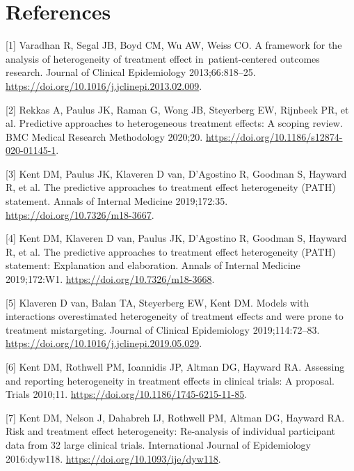 \documentclass[]{elsarticle} %
\newenvironment{cslreferences}%
  {}%
  {\par}
\begin{document}
\newpage

\hypertarget{references}{%
\section{References}\label{references}}

\setlength{\parindent}{-0.25in}
\setlength{\leftskip}{0.25in}

\noindent

\hypertarget{refs}{}
\begin{cslreferences}
\leavevmode\hypertarget{ref-Varadhan2013}{}%
{[}1{]} Varadhan R, Segal JB, Boyd CM, Wu AW, Weiss CO. A framework for
the analysis of heterogeneity of treatment effect in~patient-centered
outcomes research. Journal of Clinical Epidemiology 2013;66:818--25.
\url{https://doi.org/10.1016/j.jclinepi.2013.02.009}.

\leavevmode\hypertarget{ref-Rekkas2020}{}%
{[}2{]} Rekkas A, Paulus JK, Raman G, Wong JB, Steyerberg EW, Rijnbeek
PR, et al. Predictive approaches to heterogeneous treatment effects: A
scoping review. BMC Medical Research Methodology 2020;20.
\url{https://doi.org/10.1186/s12874-020-01145-1}.

\leavevmode\hypertarget{ref-Kent2019}{}%
{[}3{]} Kent DM, Paulus JK, Klaveren D van, D'Agostino R, Goodman S,
Hayward R, et al. The predictive approaches to treatment effect
heterogeneity (PATH) statement. Annals of Internal Medicine 2019;172:35.
\url{https://doi.org/10.7326/m18-3667}.

\leavevmode\hypertarget{ref-PathEnE}{}%
{[}4{]} Kent DM, Klaveren D van, Paulus JK, D'Agostino R, Goodman S,
Hayward R, et al. The predictive approaches to treatment effect
heterogeneity (PATH) statement: Explanation and elaboration. Annals of
Internal Medicine 2019;172:W1. \url{https://doi.org/10.7326/m18-3668}.

\leavevmode\hypertarget{ref-vanKlaveren2019}{}%
{[}5{]} Klaveren D van, Balan TA, Steyerberg EW, Kent DM. Models with
interactions overestimated heterogeneity of treatment effects and were
prone to treatment mistargeting. Journal of Clinical Epidemiology
2019;114:72--83. \url{https://doi.org/10.1016/j.jclinepi.2019.05.029}.

\leavevmode\hypertarget{ref-Kent2010}{}%
{[}6{]} Kent DM, Rothwell PM, Ioannidis JP, Altman DG, Hayward RA.
Assessing and reporting heterogeneity in treatment effects in clinical
trials: A proposal. Trials 2010;11.
\url{https://doi.org/10.1186/1745-6215-11-85}.

\leavevmode\hypertarget{ref-Kent2016}{}%
{[}7{]} Kent DM, Nelson J, Dahabreh IJ, Rothwell PM, Altman DG, Hayward
RA. Risk and treatment effect heterogeneity: Re-analysis of individual
participant data from 32 large clinical trials. International Journal of
Epidemiology 2016:dyw118. \url{https://doi.org/10.1093/ije/dyw118}.


\end{cslreferences}
\end{document}
